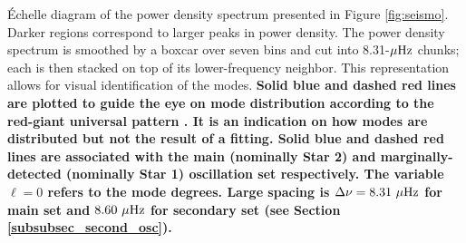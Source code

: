 \label{fig:echelle} \'Echelle diagram of the power density spectrum presented in Figure \ref{fig:seismo}. Darker regions correspond to larger peaks in power density. The power density spectrum is smoothed by a boxcar over seven bins and cut into 8.31-$\mu\rm{Hz}$ chunks; each is then stacked on top of its lower-frequency neighbor. This representation allows for visual identification of the modes. \textbf{Solid blue and dashed red lines are plotted to guide the eye on mode distribution according to the red-giant universal pattern \citep{mos11}. It is an indication on how modes are distributed but not the result of a fitting. Solid blue and dashed red lines are associated with the main (nominally Star 2) and marginally-detected (nominally Star 1) oscillation set respectively. The variable $\ell = 0$ refers to the mode degrees. Large spacing is $\Delta\nu = 8.31\ \mu\rm{Hz}$ for main set and $8.60\ \mu\rm{Hz}$ for secondary set (see Section \ref{subsubsec_second_osc}).}

  
